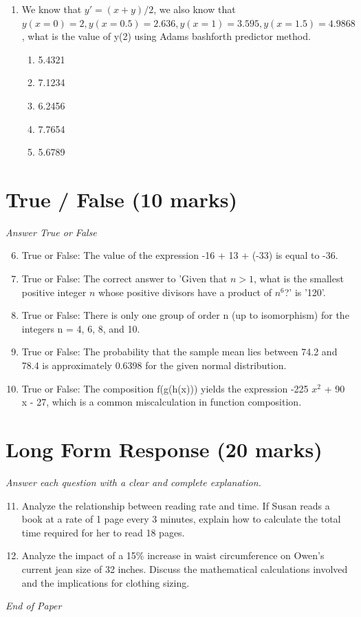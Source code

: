 \documentclass[12pt]{article}
\begin{document}
\begin{enumerate}[label=\arabic*.]
\begin{enumerate}[label=(\alph*)]
    \item multiply 180 by 2
    \item divide 180 by 20
\end{enumerate}
\item We know that $y'=(x+y) / 2$, we also know that $y(x=0) = 2, y(x=0.5) = 2.636, y(x=1) = 3.595, y(x=1.5) = 4.9868$, what is the value of y(2) using Adams bashforth predictor method.
\begin{enumerate}[label=(\alph*)]
    \item 5.4321
    \item 7.1234
    \item 6.2456
    \item 7.7654
    \item 5.6789
\end{enumerate}
\end{enumerate}

\section*{True / False (10 marks)}
\textit{Answer True or False}
\begin{enumerate}[label=\arabic*.]
\setcounter{enumi}{5}
\item True or False: The value of the expression -16 + 13 + (-33) is equal to -36.
\item True or False: The correct answer to 'Given that $n > 1$, what is the smallest positive integer $n$ whose positive divisors have a product of $n^6$?' is '120'.
\item True or False: There is only one group of order n (up to isomorphism) for the integers n = 4, 6, 8, and 10.
\item True or False: The probability that the sample mean lies between 74.2 and 78.4 is approximately 0.6398 for the given normal distribution.
\item True or False: The composition f(g(h(x))) yields the expression -225 $x^2$ + 90 x - 27, which is a common miscalculation in function composition.
\end{enumerate}

\section*{Long Form Response (20 marks)}
\textit{Answer each question with a clear and complete explanation.}
\begin{enumerate}[label=\arabic*.]
\setcounter{enumi}{10}
\item Analyze the relationship between reading rate and time. If Susan reads a book at a rate of 1 page every 3 minutes, explain how to calculate the total time required for her to read 18 pages.
\item Analyze the impact of a 15\% increase in waist circumference on Owen's current jean size of 32 inches. Discuss the mathematical calculations involved and the implications for clothing sizing.
\end{enumerate}

\vfill
\noindent\textit{End of Paper}
\end{document}
